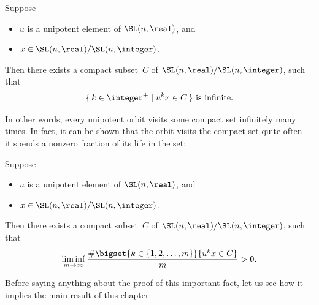 \begin{thm}[(Margulis)] 
\label{MargulisUnipReturns}
Suppose
\noprelistbreak
	\begin{itemize}
	\item $u$ is a unipotent element of\/ $\SL(n,\real)$,
	and
	\item $x \in \SL(n,\real)/\SL(n,\integer)$.
	\end{itemize}
Then there exists a compact subset~$C$ of\/ $\SL(n,\real)/\SL(n,\integer)$, such that
	$$ \text{$\{\, k \in \integer^+ \mid u^k x \in C \,\}$ is infinite} .$$
\end{thm}

In other words, every unipotent orbit visits some compact set infinitely many times. In fact, it can be shown that the orbit visits the compact set quite often --- it spends a nonzero fraction of its life in the set:

\begin{thm}
 \label{DaniMargulisUnipReturns}
Suppose
	\begin{itemize}
	\item $u$ is a unipotent element of\/ $\SL(n,\real)$,
	and
	\item $x \in \SL(n,\real)/\SL(n,\integer)$.
	\end{itemize}
Then there exists a compact subset~$C$ of\/ $\SL(n,\real)/\SL(n,\integer)$, such that
	$$ \liminf_{m \to \infty} \frac{\# \bigset{ k \in \{1,2,\ldots,m\} }{ u^k x \in C} }{m} > 0 .$$
\end{thm}

Before saying anything about the proof of this important fact, let us see how it implies the main result of this chapter:

